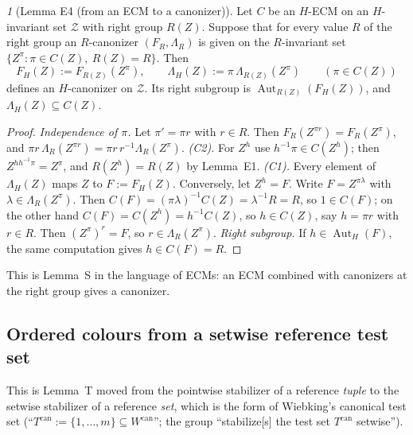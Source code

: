 \documentclass[11pt]{article}
\theoremstyle{plain}
\theoremstyle{definition}
\theoremstyle{remark}
\theoremstyle{named}
\newtheorem*{named}{}
\theoremstyle{namedrm}
\newcommand{\Aut}{\operatorname{Aut}}
\newcommand{\cZ}{\mathcal{Z}}
\begin{document}
\begin{named}[Lemma E4 (from an ECM to a canonizer)]
Let $C$ be an $H$-ECM on an $H$-invariant set $\cZ$ with right group $R(Z)$. Suppose that for every value $R$ of
the right group an $R$-canonizer $(F_R,\Lambda_R)$ is given on the $R$-invariant set
$\{Z^\pi:\pi\in C(Z),\ R(Z)=R\}$. Then
\[ F_H(Z):=F_{R(Z)}(Z^\pi),\qquad \Lambda_H(Z):=\pi\,\Lambda_{R(Z)}(Z^\pi)\qquad(\pi\in C(Z)) \]
defines an $H$-canonizer on $\cZ$. Its right subgroup is $\Aut_{R(Z)}(F_H(Z))$, and $\Lambda_H(Z)\subseteq C(Z)$.
\end{named}
\begin{proof}
\emph{Independence of $\pi$.} Let $\pi'=\pi r$ with $r\in R$. Then $F_R(Z^{\pi r})=F_R(Z^\pi)$, and
$\pi r\,\Lambda_R(Z^{\pi r})=\pi r\,r^{-1}\Lambda_R(Z^\pi)$.
\emph{(C2).} For $Z^h$ use $h^{-1}\pi\in C(Z^h)$; then $Z^{hh^{-1}\pi}=Z^\pi$, and $R(Z^h)=R(Z)$ by Lemma~E1.
\emph{(C1).} Every element of $\Lambda_H(Z)$ maps $Z$ to $F:=F_H(Z)$. Conversely, let $Z^h=F$. Write $F=Z^{\pi\lambda}$
with $\lambda\in\Lambda_R(Z^\pi)$. Then $C(F)=(\pi\lambda)^{-1}C(Z)=\lambda^{-1}R=R$, so $1\in C(F)$; on the other hand
$C(F)=C(Z^h)=h^{-1}C(Z)$, so $h\in C(Z)$, say $h=\pi r$ with $r\in R$. Then $(Z^\pi)^r=F$, so $r\in\Lambda_R(Z^\pi)$.
\emph{Right subgroup.} If $h\in\Aut_H(F)$, the same computation gives $h\in C(F)=R$.
\end{proof}
This is Lemma~S in the language of ECMs: an ECM combined with canonizers at the right group gives a
canonizer.

\subsection{Ordered colours from a setwise reference test set}

This is Lemma~T moved from the pointwise stabilizer of a reference \emph{tuple} to the setwise stabilizer
of a reference \emph{set}, which is the form of Wiebking's canonical test set \cite[pp.~102--103]{Wie21}
(``$T^{\mathrm{can}}:=\{1,\dots,m\}\subseteq W^{\mathrm{can}}$''; the group ``stabilize[s] the test set
$T^{\mathrm{can}}$ setwise'').
\end{document}

